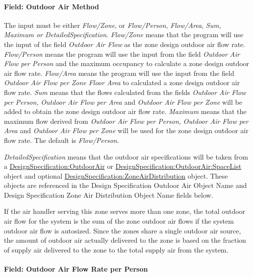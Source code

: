 \paragraph{Field: Outdoor Air Method}\label{field-outdoor-air-method-9}

The input must be either \emph{Flow/Zone}, or \emph{Flow/Person}, \emph{Flow/Area}, \emph{Sum}, \emph{Maximum or DetailedSpecification}. \emph{Flow/Zone} means that the program will use the input of the field \emph{Outdoor Air Flow} as the zone design outdoor air flow rate. \emph{Flow/Person} means the program will use the input from the field \emph{Outdoor Air Flow per Person} and the maximum occupancy to calculate a zone design outdoor air flow rate. \emph{Flow/Area} means the program will use the input from the field \emph{Outdoor Air Flow per Zone Floor Area} to calculated a zone design outdoor air flow rate. \emph{Sum} means that the flows calculated from the fields \emph{Outdoor Air Flow per Person,} \emph{Outdoor Air Flow per Area} and \emph{Outdoor Air Flow per Zone} will be added to obtain the zone design outdoor air flow rate. \emph{Maximum} means that the maximum flow derived from \emph{Outdoor Air Flow per Person,} \emph{Outdoor Air Flow per Area} and \emph{Outdoor Air Flow per Zone} will be used for the zone design outdoor air flow rate. The default is \emph{Flow/Person}.

\emph{DetailedSpecification} means that the outdoor air specifications will be taken from a \hyperref[designspecificationoutdoorair]{DesignSpecification:OutdoorAir} or \hyperref[designspecificationoutdoorairspacelist]{DesignSpecification:OutdoorAir:SpaceList} object and optional \hyperref[designspecificationzoneairdistribution]{DesignSpecification:ZoneAirDistribution} object. These objects are referenced in the Design Specification Outdoor Air Object Name and Design Specification Zone Air Distribution Object Name fields below.

If the air handler serving this zone serves more than one zone, the total outdoor air flow for the system is the sum of the zone outdoor air flows if the system outdoor air flow is autosized. Since the zones share a single outdoor air source, the amount of outdoor air actually delivered to the zone is based on the fraction of supply air delivered to the zone to the total supply air from the system.

\paragraph{Field: Outdoor Air Flow Rate per Person}\label{field-outdoor-air-flow-rate-per-person-9}

